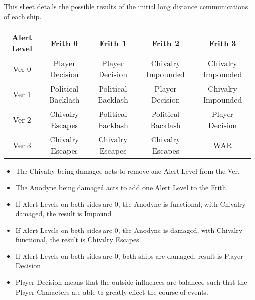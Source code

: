 \documentclass[green]{guildcamp4}
\begin{document}
\name{\gKNER{}}

This sheet details the possible results of the initial long distance communications of each ship.

\begin{tabular}{| c | c | c | c | c | }
	\hline
	Alert Level & Frith 0 & Frith 1 & Frith 2 & Frith 3 \\ \hline 
	Ver 0 & Player Decision & Player Decision & Chivalry Impounded & Chivalry Impounded   \\ \hline
	Ver 1 & Political Backlash & Political Backlash & Player Decision & Chivalry Impounded  \\ \hline
	Ver 2 & Chivalry Escapes & Political Backlash & Political Backlash & Player Decision  \\ \hline
	Ver 3 & Chivalry Escapes & Chivalry Escapes & Chivalry Escapes & WAR \hspace{2cm} \\ \hline

\end{tabular}

\begin{itemize}
\item The Chivalry being damaged acts to remove one Alert Level from the Ver.
\item The Anodyne being damaged acts to add one Alert Level to the Frith.
\item If Alert Levels on both sides are 0,  the Anodyne is functional, with Chivalry damaged, the result is Impound
\item If Alert Levels on both sides are 0, the Anodyne is damaged, with Chivalry functional, the result is Chivalry Escapes
\item If Alert Levels on both sides are 0, both ships are damaged, result is Player Decision
\item Player Decision means that the outside influences are balanced such that the Player Characters are able to greatly effect the course of events.

\end{itemize}
\end{document}
